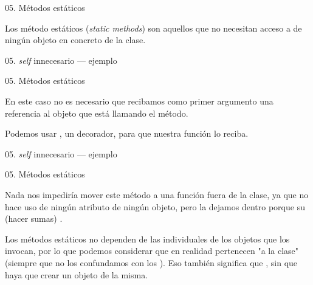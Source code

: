 
\begin{frame}{05. Métodos estáticos}
  \begin{block}{}
    \centering
    Los método estáticos (\textit{static methods}) son aquellos que no
    necesitan acceso a  de ningún objeto en
    concreto de la clase.
  \end{block}
\end{frame}

\begin{frame}{05. \textit{self} innecesario — ejemplo}
  \footnotesize
\end{frame}

\begin{frame}{05. Métodos estáticos}
  \begin{center}
    \small
    En este caso no es necesario que recibamos como primer argumento
    una referencia al objeto que está llamando el método.
  \end{center}

  \begin{block}{}
    \large
    \centering
    Podemos usar , un decorador, para que
    nuestra función  lo reciba.
  \end{block}
\end{frame}

\begin{frame}{05. \textit{self} innecesario — ejemplo}
  \scriptsize
\end{frame}

\begin{frame}{05. Métodos estáticos}
  \begin{block}{}
    \centering
     Nada nos impediría mover este método a una función fuera de la
     clase, ya que no hace uso de ningún atributo de ningún objeto,
     pero la dejamos dentro porque su  (hacer sumas)
     .
  \end{block}

  \small
  \begin{justify}
     Los métodos estáticos no dependen de las
      individuales de los objetos que los
     invocan, por lo que podemos considerar que en realidad pertenecen
     "a la clase" (siempre que no los confundamos con los
     ). Eso también significa que
     , sin
     que haya que crear un objeto de la misma.
  \end{justify}
\end{frame}

